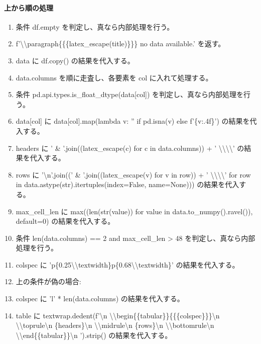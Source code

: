 \documentclass[a4paper,11pt]{article}
\begin{document}
            \paragraph{上から順の処理}
            \begin{enumerate}[leftmargin=1.8em]
            \item 条件 df.empty を判定し、真なら内部処理を行う。
\item   f'\textbackslash{}\textbackslash{}paragraph\{\{\{latex\_escape(title)\}\}\} no data available.' を返す。
\item data に df.copy() の結果を代入する。
\item data.columns を順に走査し、各要素を col に入れて処理する。
\item   条件 pd.api.types.is\_float\_dtype(data[col]) を判定し、真なら内部処理を行う。
\item     data[col] に data[col].map(lambda v: '' if pd.isna(v) else f'\{v:.4f\}') の結果を代入する。
\item headers に ' \& '.join((latex\_escape(c) for c in data.columns)) + ' \textbackslash{}\textbackslash{}\textbackslash{}\textbackslash{}' の結果を代入する。
\item rows に '\textbackslash{}n'.join((' \& '.join((latex\_escape(v) for v in row)) + ' \textbackslash{}\textbackslash{}\textbackslash{}\textbackslash{}' for row in data.astype(str).itertuples(index=False, name=None))) の結果を代入する。
\item max\_cell\_len に max((len(str(value)) for value in data.to\_numpy().ravel()), default=0) の結果を代入する。
\item 条件 len(data.columns) == 2 and max\_cell\_len > 48 を判定し、真なら内部処理を行う。
\item   colspec に 'p\{0.25\textbackslash{}\textbackslash{}textwidth\}p\{0.68\textbackslash{}\textbackslash{}textwidth\}' の結果を代入する。
\item   上の条件が偽の場合:
\item   colspec に 'l' * len(data.columns) の結果を代入する。
\item table に textwrap.dedent(f'\textbackslash{}n        \textbackslash{}\textbackslash{}begin\{\{tabular\}\}\{\{\{colspec\}\}\}\textbackslash{}n        \textbackslash{}\textbackslash{}toprule\textbackslash{}n        \{headers\}\textbackslash{}n        \textbackslash{}\textbackslash{}midrule\textbackslash{}n        \{rows\}\textbackslash{}n        \textbackslash{}\textbackslash{}bottomrule\textbackslash{}n        \textbackslash{}\textbackslash{}end\{\{tabular\}\}\textbackslash{}n        ').strip() の結果を代入する。

\end{enumerate}
\end{document}
